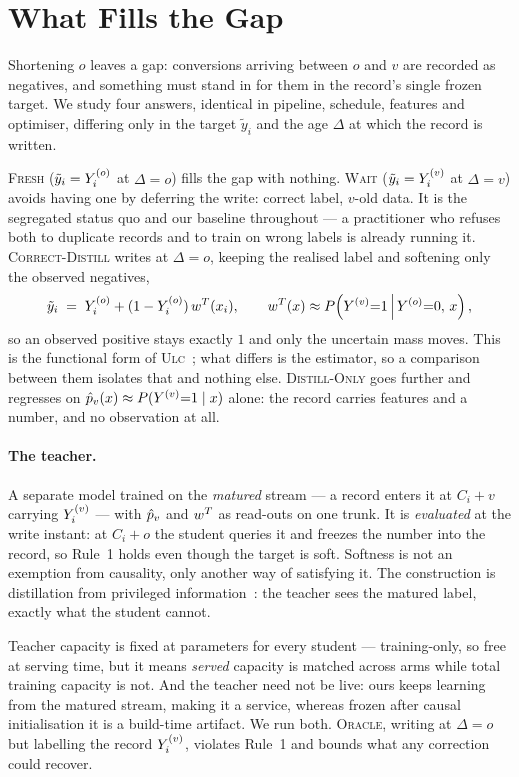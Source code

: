 \section{What Fills the Gap}
\label{sec:targets}

Shortening $o$ leaves a gap: conversions arriving between $o$ and $v$ are recorded as
negatives, and something must stand in for them in the record's single frozen target. We study
four answers, identical in pipeline, schedule, features and optimiser, differing only in the
target $\tilde y_i$ and the age $\Delta$ at which the record is written.

\textsc{Fresh} ($\tilde y_i=Y^{(o)}_i$ at $\Delta=o$) fills the gap with nothing. \textsc{Wait}
($\tilde y_i=Y^{(v)}_i$ at $\Delta=v$) avoids having one by deferring the write: correct label,
$v$-old data. It is the segregated status quo and our
baseline throughout --- a practitioner who refuses both to duplicate records and to train on
wrong labels is already running it. \textsc{Correct-Distill} writes at $\Delta=o$, keeping the realised label and softening only
the observed negatives,
\begin{equation}
  \tilde y_i \;=\; Y^{(o)}_i + (1-Y^{(o)}_i)\,w^{T}(x_i),
  \qquad
  w^{T}(x) \approx P\!\left(Y^{(v)}{=}1 \,\middle|\, Y^{(o)}{=}0,\, x\right),
  \label{eq:hybrid}
\end{equation}
so an observed positive stays exactly $1$ and only the uncertain mass moves. This is the
functional form of \textsc{Ulc}~\cite{wang2023unbiased}; what differs is the estimator, so a
comparison between them isolates that and nothing else. \textsc{Distill-Only} goes further and regresses on $\hat{p}_v(x)\approx P(Y^{(v)}{=}1\mid x)$ alone:
the record carries features and a number, and no observation at all.

\paragraph{The teacher.} A separate model trained on the \emph{matured} stream --- a record
enters it at $C_i+v$ carrying $Y^{(v)}_i$ --- with $\hat{p}_v$ and $w^{T}$ as read-outs on one trunk. It is
\emph{evaluated} at the write instant: at $C_i+o$ the student queries it and freezes the number
into the record, so Rule~1 holds even though the target is soft. Softness is not an exemption
from causality, only another way of satisfying it. The construction is distillation from
privileged information~\cite{xu2020privileged}: the teacher sees the matured label, exactly
what the student cannot.

Teacher capacity is fixed at \teacherParams{} parameters for every
student --- training-only, so free at serving time, but it means \emph{served} capacity is
matched across arms while total training capacity is not. And the teacher need not be live:
ours keeps learning from the matured stream, making it a service, whereas frozen after causal
initialisation it is a build-time artifact. We run both. \textsc{Oracle}, writing at $\Delta=o$
but labelling the record $Y^{(v)}_i$, violates Rule~1 and bounds what any correction could
recover.
